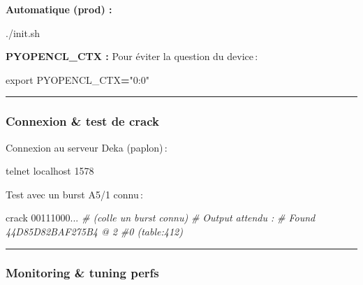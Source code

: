 \documentclass[
  french,
]{article}
\newenvironment{Shaded}{\begin{snugshade}}{\end{snugshade}}
\newcommand{\BuiltInTok}[1]{#1}
\newcommand{\CommentTok}[1]{\textcolor[rgb]{0.56,0.35,0.01}{\textit{#1}}}
\newcommand{\ExtensionTok}[1]{#1}
\newcommand{\NormalTok}[1]{#1}
\newcommand{\OperatorTok}[1]{\textcolor[rgb]{0.81,0.36,0.00}{\textbf{#1}}}
\newcommand{\StringTok}[1]{\textcolor[rgb]{0.31,0.60,0.02}{#1}}
\newcommand{\VariableTok}[1]{\textcolor[rgb]{0.00,0.00,0.00}{#1}}
\begin{document}
\textbf{Automatique (prod) :}

\begin{Shaded}
\begin{Highlighting}[]
\ExtensionTok{./init.sh}
\end{Highlighting}
\end{Shaded}

\textbf{PYOPENCL\_CTX :} Pour éviter la question du device\,:

\begin{Shaded}
\begin{Highlighting}[]
\BuiltInTok{export} \VariableTok{PYOPENCL\_CTX}\OperatorTok{=}\StringTok{"0:0"}
\end{Highlighting}
\end{Shaded}

\begin{center}\rule{0.5\linewidth}{0.5pt}\end{center}

\subsubsection{Connexion \& test de
crack}\label{connexion-test-de-crack}

Connexion au serveur Deka (paplon)\,:

\begin{Shaded}
\begin{Highlighting}[]
\ExtensionTok{telnet}\NormalTok{ localhost 1578}
\end{Highlighting}
\end{Shaded}

Test avec un burst A5/1 connu\,:

\begin{Shaded}
\begin{Highlighting}[]
\ExtensionTok{crack}\NormalTok{ 00111000...   }\CommentTok{\# (colle un burst connu)}
\CommentTok{\# Output attendu :}
\CommentTok{\# Found 44D85D82BAF275B4 @ 2 \#0 (table:412)}
\end{Highlighting}
\end{Shaded}

\begin{center}\rule{0.5\linewidth}{0.5pt}\end{center}

\subsubsection{Monitoring \& tuning
perfs}\label{monitoring-tuning-perfs}
\end{document}
